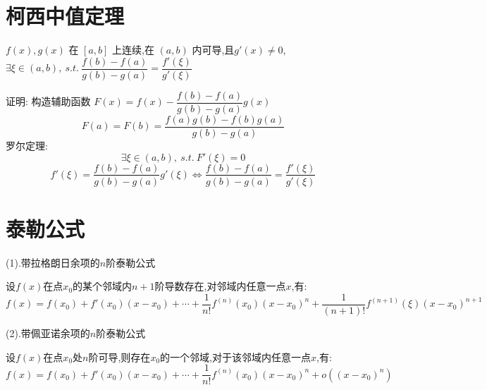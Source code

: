 \section{柯西中值定理}
\begin{theorem}[柯西中值定理]

	$f(x),g(x)$ 在 $[a,b]$ 上连续,在 $(a,b)$ 内可导,且$g'(x)\neq 0$,$\exists \xi\in(a,b),\ s.t.\ \dfrac{f(b)-f(a)}{g(b)-g(a)}=\dfrac{f'(\xi)}{g'(\xi)}$

	证明: 构造辅助函数 $F(x)=f(x)-\dfrac{f(b)-f(a)}{g(b)-g(a)}g(x)$
	$$F(a)=F(b)=\frac{f(a)g(b)-f(b)g(a)}{g(b)-g(a)}$$
	罗尔定理:
	$$\exists \xi\in(a,b),\ s.t.\ F'(\xi)=0$$
	$$ f'(\xi)=\frac{f(b)-f(a)}{g(b)-g(a)}g'(\xi)\Leftrightarrow  \frac{f(b)-f(a)}{g(b)-g(a)}=\frac{f'(\xi)}{g'(\xi)}$$
\end{theorem}
\section{泰勒公式}
\begin{theorem}[泰勒公式]

	(1).带拉格朗日余项的$n$阶泰勒公式

	设$f(x)$在点$x_{0}$的某个邻域内$n+1$阶导数存在,对邻域内任意一点$x$,有:
	$$f(x)=f(x_{0})+f'(x_{0})(x-x_{0})+\cdots+\frac{1}{n!}f^{(n)}(x_{0})(x-x_{0})^{n}+\frac{1}{(n+1)!}f^{(n+1)}(\xi)(x-x_{0})^{n+1}$$

	(2).带佩亚诺余项的$n$阶泰勒公式

	设$f(x)$在点$x_{0}$处$n$阶可导,则存在$x_{0}$的一个邻域,对于该邻域内任意一点$x$,有:
	$$f(x)=f(x_{0})+f'(x_{0})(x-x_{0})+\cdots+\frac{1}{n!}f^{(n)}(x_{0})(x-x_{0})^{n}+o((x-x_{0})^n)$$
\end{theorem}

